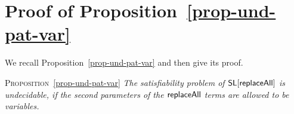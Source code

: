 
\appendix
 

\def\refpropundpat{\ref{prop-und-pat-var}}

\section{Proof of Proposition~\protect\refpropundpat}
\label{sec:prop-und-pat-var-proof}

We recall Proposition~\ref{prop-und-pat-var} and then give its proof.

\noindent \textsc{Proposition}~\ref{prop-und-pat-var}
{\em The satisfiability problem of $\mathsf{SL}[\mathsf{replaceAll}]$ is undecidable, if the second parameters of the $\mathsf{replaceAll}$ terms are allowed to be variables.
}

